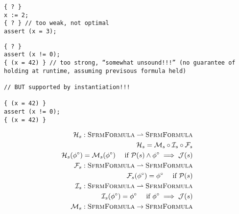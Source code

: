 
\begin{verbatim}
{ ? }
x := 2;
{ ? } // too weak, not optimal
assert (x = 3);
\end{verbatim}
\begin{verbatim}
{ ? }
assert (x != 0);
{ (x = 42) } // too strong, “somewhat unsound!!!” (no guarantee of holding at runtime, assuming previsous formula held)

// BUT supported by instantiation!!!

{ (x = 42) }
assert (x != 0);
{ (x = 42) }
\end{verbatim}

\begin{align*}
\mathcal{H}_s : \textsc{SfrmFormula} \rightharpoonup \textsc{SfrmFormula}\\
\mathcal{H}_s = \mathcal{M}_s \circ \mathcal{I}_s \circ \mathcal{F}_s\\
\mathcal{H}_s({\phi}^{\circ}) = \mathcal{M}_s({\phi}^{\circ}) \quad\text{ if $\mathcal{P}(s) \wedge {\phi}^{\circ} \implies \mathcal{J}(s)$} \\
\mathcal{F}_s : \textsc{SfrmFormula} \rightharpoonup \textsc{SfrmFormula}\\
\mathcal{F}_s({\phi}^{\circ}) = {\phi}^{\circ} \quad\text{ if $\mathcal{P}(s)$} \\
\mathcal{I}_s : \textsc{SfrmFormula} \rightharpoonup \textsc{SfrmFormula}\\
\mathcal{I}_s({\phi}^{\circ}) = {\phi}^{\circ} \quad\text{ if ${\phi}^{\circ} \implies \mathcal{J}(s)$} \\
\mathcal{M}_s : \textsc{SfrmFormula} \rightarrow \textsc{SfrmFormula}\\
\end{align*}


